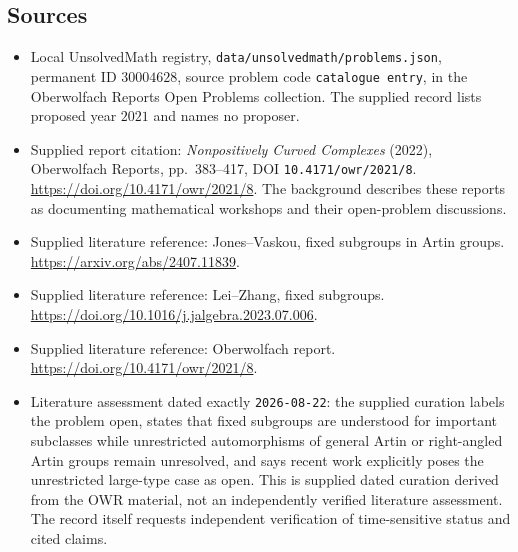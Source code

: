 \documentclass[11pt]{article}
\begin{document}
\subsection{Sources}
\begin{itemize}
\item Local UnsolvedMath registry, \texttt{data/unsolvedmath/problems.json}, permanent ID \(30004628\), source problem code \texttt{catalogue entry}, in the Oberwolfach Reports Open Problems collection. The supplied record lists proposed year \(2021\) and names no proposer.
\item Supplied report citation: \emph{Nonpositively Curved Complexes} (2022), Oberwolfach Reports, pp.\ 383--417, DOI \texttt{10.4171/owr/2021/8}. \url{https://doi.org/10.4171/owr/2021/8}. The background describes these reports as documenting mathematical workshops and their open-problem discussions.
\item Supplied literature reference: Jones--Vaskou, fixed subgroups in Artin groups. \url{https://arxiv.org/abs/2407.11839}.
\item Supplied literature reference: Lei--Zhang, fixed subgroups. \url{https://doi.org/10.1016/j.jalgebra.2023.07.006}.
\item Supplied literature reference: Oberwolfach report. \url{https://doi.org/10.4171/owr/2021/8}.
\item Literature assessment dated exactly \texttt{2026-08-22}: the supplied curation labels the problem open, states that fixed subgroups are understood for important subclasses while unrestricted automorphisms of general Artin or right-angled Artin groups remain unresolved, and says recent work explicitly poses the unrestricted large-type case as open. This is supplied dated curation derived from the OWR material, not an independently verified literature assessment. The record itself requests independent verification of time-sensitive status and cited claims.
\end{itemize}
\end{document}
